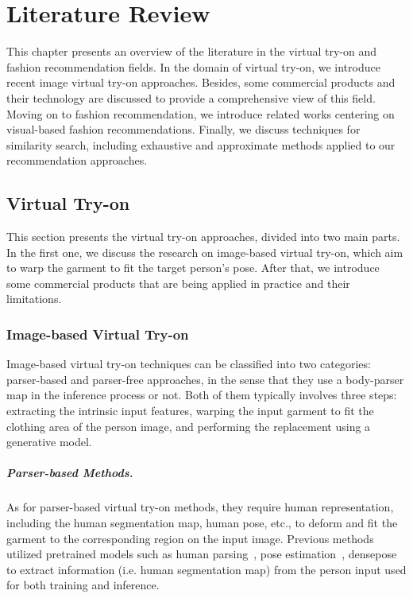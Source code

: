 \chapter{Literature Review}
\label{chapter-literature-review}
\begin{ChapAbstract}
This chapter presents an overview of the literature in the virtual try-on and fashion recommendation fields. In the domain of virtual try-on, we introduce recent image virtual try-on approaches. Besides, some commercial products and their technology are discussed to provide a comprehensive view of this field. Moving on to fashion recommendation, we introduce related works centering on visual-based fashion recommendations. Finally, we discuss techniques for similarity search, including exhaustive and approximate methods applied to our recommendation approaches.
\end{ChapAbstract}
\section{Virtual Try-on}
This section presents the virtual try-on approaches, divided into two main parts. In the first one, we discuss the research on image-based virtual try-on, which aim to warp the garment to fit the target person's pose. After that, we introduce some commercial products that are being applied in practice and their limitations.

\subsection{Image-based Virtual Try-on}
Image-based virtual try-on techniques can be classified into two categories: parser-based and parser-free approaches, in the sense that they use a body-parser map in the inference process or not. Both of them typically involves three steps: extracting the intrinsic input features, warping the input garment to fit the clothing area of the person image, and performing the replacement using a generative model.

\paragraph{Parser-based Methods.} As for parser-based virtual try-on methods, they require human representation, including the human segmentation map, human pose, etc., to deform and fit the garment to the corresponding region on the input image. Previous methods~\cite{Han-CVPR2018-Viton, Wang-ECCV2018-Toward, Han-ICCV2019-Clothflow, Yang-CVPR2020-Towards, Fele-WACV2022-CVTON, Bai-ECCV2022-Single} utilized pretrained models such as human parsing~\cite{Gong-CVPR2017-Look, Li-TPAMI2020-Self}, pose estimation~\cite{Cao-CVPR2017-Realtime}, densepose~\cite{Guler-CVPR2018-DensePose} to extract information (i.e. human segmentation map) from the person input used for both training and inference.

